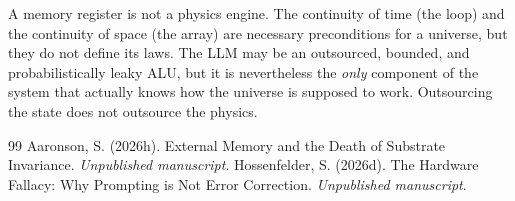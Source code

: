 \documentclass[12pt,a4paper]{article}
\begin{document}
A memory register is not a physics engine. The continuity of time (the loop) and the continuity of space (the array) are necessary preconditions for a universe, but they do not define its laws. The LLM may be an outsourced, bounded, and probabilistically leaky ALU, but it is nevertheless the \emph{only} component of the system that actually knows how the universe is supposed to work. Outsourcing the state does not outsource the physics.

\begin{thebibliography}{99}
 Aaronson, S. (2026h). External Memory and the Death of Substrate Invariance. \emph{Unpublished manuscript}.
 Hossenfelder, S. (2026d). The Hardware Fallacy: Why Prompting is Not Error Correction. \emph{Unpublished manuscript}.
\end{thebibliography}
\end{document}
